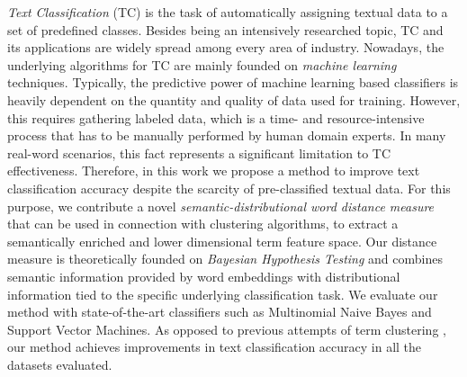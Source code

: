 
\Abstract
\emph{Text Classification} (TC) is the task of automatically assigning textual data to a set of predefined classes.
Besides being an intensively researched topic, TC and its applications are widely spread among every area of industry.
Nowadays, the underlying algorithms for TC are mainly founded on \emph{machine learning} techniques.  
Typically, the predictive power of machine learning based classifiers is heavily dependent on the quantity and quality of data 
used for training. 
However, this requires gathering labeled data, which is a time- and resource-intensive process that has to be manually performed 
by human domain experts.
In many real-word scenarios, this fact represents a significant limitation to TC effectiveness. 
Therefore, in this work we propose a method to improve text classification accuracy despite the scarcity of pre-classified textual data. 
For this purpose, we contribute a novel \emph{semantic-distributional word distance measure} that can be used in connection with clustering algorithms, 
to extract a semantically enriched and lower dimensional term feature space. Our distance measure is theoretically founded on
\emph{Bayesian Hypothesis Testing} and combines semantic information provided by word embeddings \cite{mikolov2013distributed} 
with distributional information tied to the specific underlying classification task. We evaluate our method with state-of-the-art 
classifiers such as Multinomial Naive Bayes and Support Vector Machines. As opposed to previous 
attempts of term clustering \cite{baker1998distributional, ma2015using}, our method achieves improvements 
in text classification accuracy in all the datasets evaluated. 